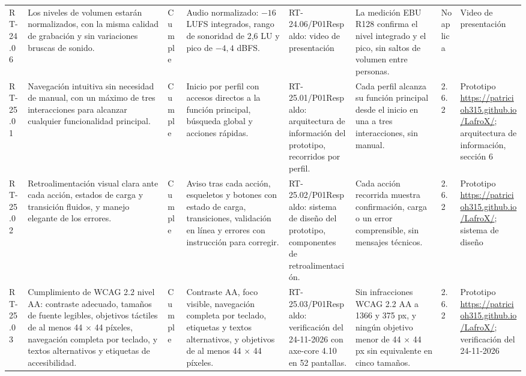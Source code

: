 \documentclass[oficio,firma,final]{lafrox}
\begin{document}
\begin{landscape}
{\begin{longtable}{@{}F{0.054} F{0.173} F{0.061} F{0.191} F{0.106} F{0.180} F{0.067} F{0.168}@{}}
  RT-24.06 & Los niveles de volumen estarán normalizados, con la misma calidad de grabación y sin variaciones bruscas de sonido. & Cumple & Audio normalizado: $-16$ LUFS integrados, rango de sonoridad de 2,6 LU y pico de $-4{,}4$ dBFS. & RT-24.06/\allowbreak{}P01\newline Respaldo: video de presentación & La medición EBU R128 confirma el nivel integrado y el pico, sin saltos de volumen entre personas. & No aplica & Video de presentación  \\
  RT-25.01 & Navegación intuitiva sin necesidad de manual, con un máximo de tres interacciones para alcanzar cualquier funcionalidad principal. & Cumple & Inicio por perfil con accesos directos a la función principal, búsqueda global y acciones rápidas. & RT-25.01/\allowbreak{}P01\newline Respaldo: arquitectura de información del prototipo, recorridos por perfil. & Cada perfil alcanza su función principal desde el inicio en una a tres interacciones, sin manual. & 2.6.2 & Prototipo \url{https://patricioh315.github.io/LafroX/}; arquitectura de información, sección 6  \\
  RT-25.02 & Retroalimentación visual clara ante cada acción, estados de carga y transición fluidos, y manejo elegante de los errores. & Cumple & Aviso tras cada acción, esqueletos y botones con estado de carga, transiciones, validación en línea y errores con instrucción para corregir. & RT-25.02/\allowbreak{}P01\newline Respaldo: sistema de diseño del prototipo, componentes de retroalimentación. & Cada acción recorrida muestra confirmación, carga o un error comprensible, sin mensajes técnicos. & 2.6.2 & Prototipo \url{https://patricioh315.github.io/LafroX/}; sistema de diseño  \\
  RT-25.03 & Cumplimiento de WCAG 2.2 nivel AA: contraste adecuado, tamaños de fuente legibles, objetivos táctiles de al menos 44 $\times$ 44 píxeles, navegación completa por teclado, y textos alternativos y etiquetas de accesibilidad. & Cumple & Contraste AA, foco visible, navegación completa por teclado, etiquetas y textos alternativos, y objetivos de al menos 44 $\times$ 44 píxeles. & RT-25.03/\allowbreak{}P01\newline Respaldo: verificación del 24-11-2026 con axe-core 4.10 en 52 pantallas. & Sin infracciones WCAG 2.2 AA a 1366 y 375 px, y ningún objetivo menor de 44 $\times$ 44 px sin equivalente en cinco tamaños. & 2.6.2 & Prototipo \url{https://patricioh315.github.io/LafroX/}; verificación del 24-11-2026  \\

\end{longtable}}
\end{landscape}
\end{document}
